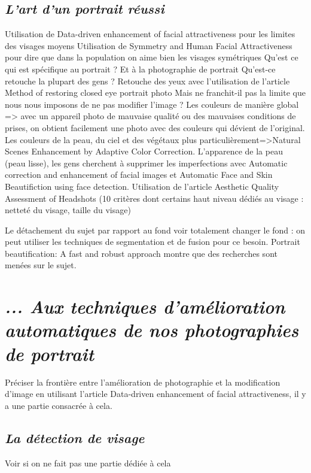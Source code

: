 \documentclass[11pt, french]{report-rd-info}
\begin{document}
\subsection{\emph{L’art d’un portrait réussi}}
Utilisation de Data-driven enhancement of facial attractiveness pour les limites des visages moyens
Utilisation de Symmetry and Human Facial Attractiveness pour dire que dans la population on aime bien les visages symétriques
Qu’est ce qui est spécifique au portrait ? Et à la photographie de portrait
Qu’est-ce retouche la plupart des gens ?
Retouche des yeux avec l’utilisation de l’article Method of restoring closed eye portrait photo
Mais ne franchit-il pas la limite que nous nous imposons de ne pas modifier l’image ?
Les couleurs de manière global => avec un appareil photo de mauvaise qualité ou des mauvaises conditions de prises, on obtient facilement une photo avec des couleurs qui dévient de l’original.
Les couleurs de la peau, du ciel et des végétaux plus particulièrement=>Natural Scenes Enhancement by Adaptive Color Correction.
L’apparence de la peau (peau lisse), les gens cherchent à supprimer les imperfections avec Automatic correction and enhancement of facial images et Automatic Face and Skin Beautifiction using face detection.
Utilisation de l’article Aesthetic Quality Assessment of Headshots (10 critères dont certains haut niveau dédiés au visage : netteté du visage, taille du visage) 



Le détachement du sujet par rapport au fond voir totalement changer le fond :  on peut utiliser les techniques de segmentation et de fusion pour ce besoin. Portrait beautification: A fast and robust approach montre que des recherches sont menées sur le sujet.
\section{\emph{... Aux techniques d’amélioration automatiques de nos photographies de portrait}}
Préciser la frontière entre l’amélioration de photographie et la modification d’image en utilisant l’article Data-driven enhancement of facial attractiveness, il y a une partie consacrée à cela.



\subsection{\emph{La détection de visage}}
Voir si on ne fait pas une partie dédiée à cela
\end{document}
